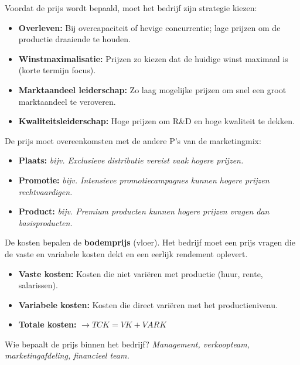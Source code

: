 \documentclass[a4paper,11pt]{article}
\begin{document}
\begin{description}
    \item{} Voordat de prijs wordt bepaald, moet het bedrijf zijn strategie kiezen:
    \begin{itemize}
        \item \textbf{Overleven:} Bij overcapaciteit of hevige concurrentie; lage prijzen om de productie draaiende te houden.
        \item \textbf{Winstmaximalisatie:} Prijzen zo kiezen dat de huidige winst maximaal is (korte termijn focus).
        \item \textbf{Marktaandeel leiderschap:} Zo laag mogelijke prijzen om snel een groot marktaandeel te veroveren.
        \item \textbf{Kwaliteitsleiderschap:} Hoge prijzen om R\&D en hoge kwaliteit te dekken.
    \end{itemize}

    \item{} De prijs moet overeenkomsten met de andere P's van de marketingmix:
    \begin{itemize}
        \item \textbf{Plaats:} \textit{bijv. Exclusieve distributie vereist vaak hogere prijzen.}
        \item \textbf{Promotie:} \textit{bijv. Intensieve promotiecampagnes kunnen hogere prijzen rechtvaardigen.}
        \item \textbf{Product:} \textit{bijv. Premium producten kunnen hogere prijzen vragen dan basisproducten.}
    \end{itemize}

    \item{} De kosten bepalen de \textbf{bodemprijs} (vloer). 
    Het bedrijf moet een prijs vragen die de vaste en variabele kosten dekt en een eerlijk rendement oplevert.
    \begin{itemize}
        \item \textbf{Vaste kosten:} Kosten die niet variëren met productie (huur, rente, salarissen).
        \item \textbf{Variabele kosten:} Kosten die direct variëren met het productieniveau.
        \item \textbf{Totale kosten:} $ \rightarrow TCK = VK + VARK $
    \end{itemize}


    \item{}
    Wie bepaalt de prijs binnen het bedrijf? 
    \textit{Management, verkoopteam, marketingafdeling, financieel team.}
\end{description}
\end{document}
